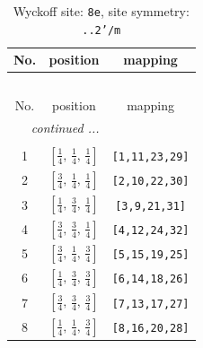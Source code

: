 \documentclass[fleqn,8pt]{jsarticle}
\begin{document}
\renewcommand{\arraystretch}{1.2}
\begin{longtable}{ccc}
\caption{Wyckoff site: {\tt 8e}, site symmetry: {\tt ..2'/m}}
 \\
 \hline \hline
No. & position & mapping \\ \hline \endfirsthead

\multicolumn{2}{l}{\tablename\ \thetable{}} \\
 \hline \hline
No. & position & mapping \\ \hline \endhead

 \hline \hline
\multicolumn{2}{r}{\footnotesize\it continued ...} \\ \endfoot

 \hline \hline
\multicolumn{2}{r}{} \\ \endlastfoot

1 & $\left[ \frac{1}{4},\, \frac{1}{4},\, \frac{1}{4} \right]$ & {\tt [1,11,23,29]} \\ \hline
2 & $\left[ \frac{3}{4},\, \frac{1}{4},\, \frac{1}{4} \right]$ & {\tt [2,10,22,30]} \\ \hline
3 & $\left[ \frac{1}{4},\, \frac{3}{4},\, \frac{1}{4} \right]$ & {\tt [3,9,21,31]} \\ \hline
4 & $\left[ \frac{3}{4},\, \frac{3}{4},\, \frac{1}{4} \right]$ & {\tt [4,12,24,32]} \\ \hline
5 & $\left[ \frac{3}{4},\, \frac{1}{4},\, \frac{3}{4} \right]$ & {\tt [5,15,19,25]} \\ \hline
6 & $\left[ \frac{1}{4},\, \frac{3}{4},\, \frac{3}{4} \right]$ & {\tt [6,14,18,26]} \\ \hline
7 & $\left[ \frac{3}{4},\, \frac{3}{4},\, \frac{3}{4} \right]$ & {\tt [7,13,17,27]} \\ \hline
8 & $\left[ \frac{1}{4},\, \frac{1}{4},\, \frac{3}{4} \right]$ & {\tt [8,16,20,28]} \\
\end{longtable}
\renewcommand{\arraystretch}{1.2}
\end{document}
